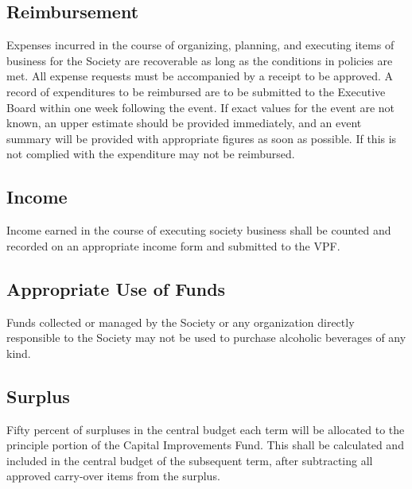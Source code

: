 \subsection{Reimbursement}
Expenses incurred in the course of organizing, planning, and executing items of business for the Society are recoverable as long as the conditions in policies are met.
All expense requests must be accompanied by a receipt to be approved.
A record of expenditures to be reimbursed are to be submitted to the Executive Board within one week following the event. If exact values for the event are not known, an upper estimate should be provided immediately, and an event summary will be provided with appropriate figures as soon as possible. If this is not complied with the expenditure may not be reimbursed.

\subsection{Income}
Income earned in the course of executing society business shall be counted and recorded on an appropriate income form and submitted to the VPF.

\subsection{Appropriate Use of Funds}
Funds collected or managed by the Society or any organization directly responsible to the Society may not be used to purchase alcoholic beverages of any kind.

\subsection{Surplus}
 Fifty percent of surpluses in the central budget each term will be allocated to the principle portion of the Capital Improvements Fund. This shall be calculated and included in the central budget of the subsequent term, after subtracting all approved carry-over items from the surplus.